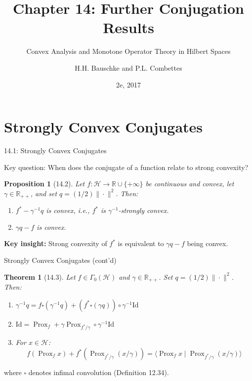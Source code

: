 \documentclass[aspectratio=169,10pt]{beamer}
\title[Chapter 14: Further Conjugation]{Chapter 14: Further Conjugation Results}
\subtitle{Convex Analysis and Monotone Operator Theory in Hilbert Spaces}
\author[Bauschke \& Combettes]{H.H. Bauschke and P.L. Combettes}
\date{2e, 2017}
\newtheorem{prop}{Proposition}
\newtheorem{thm}{Theorem}
\DeclareMathOperator{\Prox}{Prox}
\begin{document}
\frame{\titlepage}


\section{Strongly Convex Conjugates}

\begin{frame}{14.1: Strongly Convex Conjugates}
  \vspace{-0.3cm}

  Key question: When does the conjugate of a function relate to strong convexity?

  \begin{prop}[14.2]
    Let $f: \mathcal{H} \to \mathbb{R} \cup \{+\infty\}$ be continuous and convex,
    let $\gamma \in \mathbb{R}_{++}$, and set $q = (1/2)\|\cdot\|^2$. Then:
    \begin{enumerate}
      \item[(i)] $f^* - \gamma^{-1}q$ is convex, i.e., $f^*$ is $\gamma^{-1}$-strongly convex.
      \item[(ii)] $\gamma q - f$ is convex.
    \end{enumerate}
  \end{prop}

  \vspace{0.3cm}

  \textbf{Key insight:} Strong convexity of $f^*$ is equivalent to $\gamma q - f$ being convex.
\end{frame}

\begin{frame}{Strongly Convex Conjugates (cont'd)}
  \vspace{-0.3cm}

  \begin{thm}[14.3]
    Let $f \in \Gamma_0(\mathcal{H})$ and $\gamma \in \mathbb{R}_{++}$. Set $q = (1/2)\|\cdot\|^2$. Then:
    \begin{enumerate}
      \item[(i)] $\gamma^{-1}q = f \square (\gamma^{-1}q) + (f^* \square (\gamma q)) \circ \gamma^{-1}\text{Id}$
      \item[(ii)] $\text{Id} = \Prox_f + \gamma\Prox_{f^*/\gamma} \circ \gamma^{-1}\text{Id}$
      \item[(iii)] For $x \in \mathcal{H}$:
        \[
          f(\Prox_f x) + f^*(\Prox_{f^*/\gamma}(x/\gamma)) = \langle \Prox_f x \mid \Prox_{f^*/\gamma}(x/\gamma) \rangle
        \]
    \end{enumerate}
  \end{thm}

  \vspace{0.2cm}

  where $\square$ denotes infimal convolution (Definition 12.34).
\end{frame}
\end{document}
